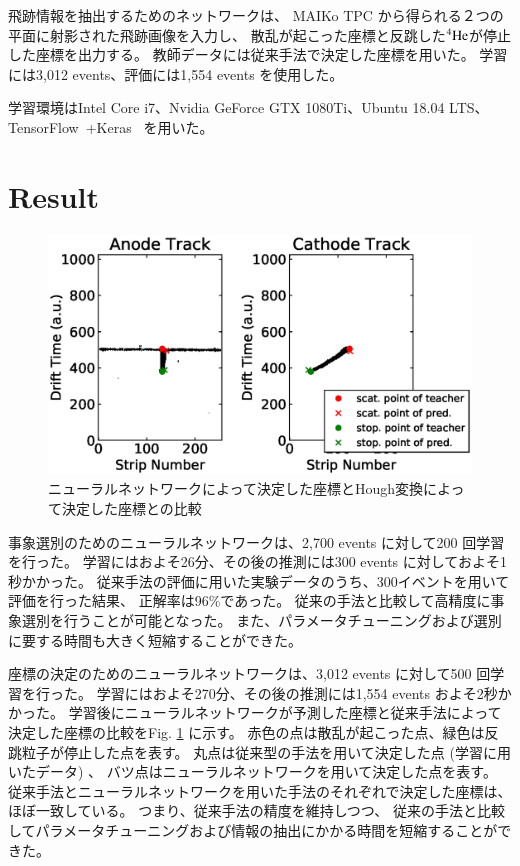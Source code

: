 \documentclass{jps-cp}
\begin{document}
飛跡情報を抽出するためのネットワークは、
MAIKo TPC から得られる２つの平面に射影された飛跡画像を入力し、
散乱が起こった座標と反跳した${}^{4}\rm{He}$が停止した座標を出力する。
教師データには従来手法で決定した座標を用いた。
学習には3,012 events、評価には1,554 events を使用した。

学習環境はIntel Core i7、Nvidia GeForce GTX 1080Ti、Ubuntu 18.04 LTS、
TensorFlow~\cite{tensorflow}+Keras~\cite{keras} を用いた。

\section{Result}
\begin{figure}
  \vspace{-4zw}
  \centering
  \includegraphics[clip, width=25zw]{eps/point_detection_compair.eps}
  \caption{ニューラルネットワークによって決定した座標とHough変換によって決定した座標との比較}
  \label{fig:result_detection}
\end{figure}

事象選別のためのニューラルネットワークは、2,700 events に対して200 回学習を行った。
学習にはおよそ26分、その後の推測には300 events に対しておよそ1秒かかった。
従来手法の評価に用いた実験データのうち、300イベントを用いて評価を行った結果、
正解率は96\%であった。
従来の手法と比較して高精度に事象選別を行うことが可能となった。
また、パラメータチューニングおよび選別に要する時間も大きく短縮することができた。

座標の決定のためのニューラルネットワークは、3,012 events に対して500 回学習を行った。
学習にはおよそ270分、その後の推測には1,554 events およそ2秒かかった。
学習後にニューラルネットワークが予測した座標と従来手法によって決定した座標の比較をFig. \ref{fig:result_detection} に示す。
赤色の点は散乱が起こった点、緑色は反跳粒子が停止した点を表す。
丸点は従来型の手法を用いて決定した点 (学習に用いたデータ) 、
バツ点はニューラルネットワークを用いて決定した点を表す。
従来手法とニューラルネットワークを用いた手法のそれぞれで決定した座標は、
ほぼ一致している。
つまり、従来手法の精度を維持しつつ、
従来の手法と比較してパラメータチューニングおよび情報の抽出にかかる時間を短縮することができた。
\end{document}
